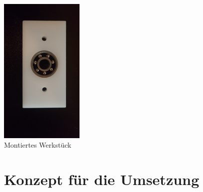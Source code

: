 \documentclass[12pt]{article}
\begin{document}
\begin{center}
\includegraphics[width=0.3\textwidth]{img/montiertes_werkstueck}\\
Montiertes Werkstück
\end{center}

\newpage
\section{Konzept für die Umsetzung}
\end{document}
